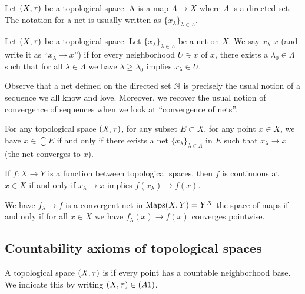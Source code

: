 \begin{definition}
Let $(X,\tau)$ be a topological space. A  is a map
$\Lambda\to X$ where $\Lambda$ is a directed set. The notation for a
net is usually written as $\{x_{\lambda}\}_{\lambda\in\Lambda}$.
\end{definition}

\begin{definition}
Let $(X,\tau)$ be a topological space.
Let $\{x_{\lambda}\}_{\lambda\in\Lambda}$ be a net on $X$. We say
$x_{\lambda}$  $x$ (and write it as
``$x_{\lambda}\to x$'') if for every neighborhood $U\ni x$ of $x$,
there exists a $\lambda_{0}\in\Lambda$ such that for all
$\lambda\in\Lambda$ we have $\lambda\geq\lambda_{0}$ implies
$x_{\lambda}\in U$.
\end{definition}

\begin{remark}
Observe that a net defined on the directed set $\mathbb{N}$ is precisely the
usual notion of a sequence we all know and love. Moreover, we recover
the usual notion of convergence of sequences when we look at
``convergence of nets''.
\end{remark}

\begin{theorem}
For any topological space $(X,\tau)$, for any subset $E\subset X$,
for any point $x\in X$, we have $x\in\closure{E}$ if and only
if there exists a net $\{x_{\lambda}\}_{\lambda\in\Lambda}$ in $E$
such that $x_{\lambda}\to x$ (the net converges to $x$).
\end{theorem}

\begin{theorem}
If $f\colon X\to Y$ is a function between topological spaces,
then $f$ is continuous at $x\in X$ if and only if $x_{\lambda}\to x$
implies $f(x_{\lambda})\to f(x)$.
\end{theorem}

\begin{theorem}
We have $f_{\lambda}\to f$ is a convergent net in $\operatorname{Maps}(X,Y)=Y^{X}$ the
space of maps if and only if for all $x\in X$ we have
$f_{\lambda}(x)\to f(x)$ converges pointwise.
\end{theorem}

\subsection{Countability axioms of topological spaces}

\begin{definition}
A topological space $(X,\tau)$ is 
if every point has a countable neighborhood base. We indicate this by
writing $(X,\tau)\in(A1)$.
\end{definition}

